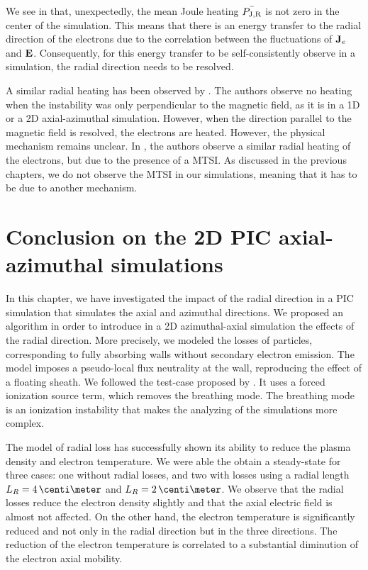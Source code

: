   We see in  that, unexpectedly,  the mean Joule heating $\bar{P_{\rm J, R}}$ is not zero in the center of the simulation.
  This means that there is an energy transfer to the radial direction of the electrons due to the correlation between the fluctuations of ${\mathbf J_e}$ and ${\mathbf E}$.
  Consequently, for this energy transfer to be self-consistently observe in a simulation, the radial direction needs to be resolved.

  A similar radial heating has been observed by \citet{heron2013}.
  The authors observe no heating when the instability was only perpendicular to the magnetic field, as it is in a \ac{1D} or a \ac{2D} axial-azimuthal simulation.
  However, when the direction parallel to the magnetic field is resolved, the electrons are heated.
  However, the physical mechanism remains unclear.
  In \citet{janhunen}, the authors observe a similar radial heating of the electrons, but due to the presence of a \ac{MTSI}.
  As discussed in the previous chapters, we do not observe the \ac{MTSI} in our simulations, meaning that it has to be due to another mechanism.




\section{Conclusion on the 2D PIC axial-azimuthal simulations}

In this chapter, we have investigated the impact of the radial direction in a \ac{PIC} simulation that simulates the axial and azimuthal directions.
We proposed an algorithm in order to introduce in a \ac{2D} azimuthal-axial simulation the effects of the radial direction.
More precisely, we modeled the losses of particles, corresponding to fully absorbing walls without secondary electron emission.
The model imposes a pseudo-local flux neutrality at the wall, reproducing the effect of a floating sheath.
We followed the test-case proposed by \citet{boeuf2018}.
It uses a forced ionization source term, which removes the breathing mode.
The breathing mode is an ionization instability that makes the analyzing of the simulations more complex.

The model of radial loss has successfully shown its ability to reduce the plasma density and electron temperature.
We were able the obtain a steady-state for three cases\string: one without radial losses, and two with losses using a radial length $L_R=4\,\centi\meter$ and $L_R=2\,\centi\meter$.
We observe that the radial losses reduce the electron density slightly and that the axial electric field is almost not affected.
On the other hand, the electron temperature is significantly reduced and not only in the radial direction but in the three directions.
The reduction of the electron temperature is correlated to a substantial diminution of the electron axial mobility.

